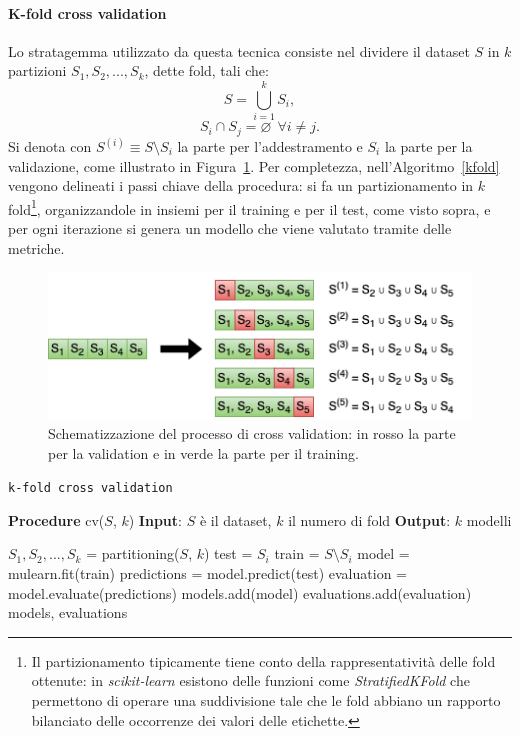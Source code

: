 \documentclass[12pt]{report}
\theoremstyle{definition}
\let\emptyset\varnothing
\begin{document}
\paragraph{K-fold cross validation}
Lo stratagemma utilizzato da questa tecnica consiste nel dividere il dataset $S$ in $k$ partizioni $S_1, S_2, ..., S_k$, dette fold, tali che:
\begin{equation}
     S = \bigcup\limits_{i=1}^{k} S_{i},
\end{equation}
\begin{equation}
    S_i \cap S_j = \emptyset \ \ \forall i \neq j.
\end{equation}
Si denota con $S^{(i)} \equiv S \setminus S_i$ la parte per l'addestramento e $S_i$ la parte per la validazione, come illustrato in Figura~\ref{cv}.
Per completezza, nell'Algoritmo~\ref{kfold} vengono delineati i passi chiave della procedura: si fa un partizionamento in $k$ fold\footnote{Il partizionamento tipicamente tiene conto della rappresentatività delle fold ottenute: in \textit{scikit-learn} esistono delle funzioni come \textit{StratifiedKFold} che permettono di operare una suddivisione tale che le fold abbiano un rapporto bilanciato delle occorrenze dei valori delle etichette.}, organizzandole in insiemi per il training e per il test, come visto sopra, e per ogni iterazione si genera un modello che viene valutato tramite delle metriche.
\begin{figure}
    \centering
    \includegraphics[scale=0.83]{images/cv.png}
    \caption{Schematizzazione del processo di cross validation: in rosso la parte per la validation e in verde la parte per il training.}
    \label{cv}
\end{figure}
\begin{algorithm}
\caption{\texttt{k-fold cross validation}}
\label{kfold}
\hspace*{\algorithmicindent} \textbf{Procedure} cv($S$, $k$)
\newline
\hspace*{\algorithmicindent} \textbf{Input}: $S$ è il dataset, $k$ il numero di fold
\newline
\hspace*{\algorithmicindent} \textbf{Output}: $k$ modelli
\begin{algorithmic}[1]
\STATE $S_1, S_2, ..., S_k$ = partitioning($S$, $k$)
\STATE test = $S_i$
\STATE train = $S \setminus S_i$
\STATE model = mulearn.fit(train)
\STATE predictions = model.predict(test)
\STATE evaluation = model.evaluate(predictions)
\STATE models.add(model)
\STATE evaluations.add(evaluation)
\ENDFOR
\RETURN models, evaluations
\end{algorithmic}
\end{algorithm}
\end{document}
